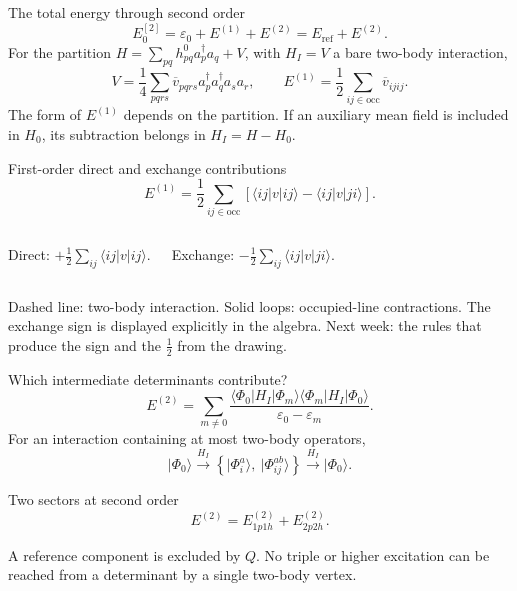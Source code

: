 \documentclass[aspectratio=169,10pt]{beamer}
\newcommand{\ket}[1]{\vert #1\rangle}
\newcommand{\mel}[3]{\langle #1\lvert #2\rvert #3\rangle}
\newcommand{\cre}[1]{a_{#1}^{\dagger}}
\newcommand{\ann}[1]{a_{#1}}
\newcommand{\vbar}[4]{\overline v_{#1#2#3#4}}
\newcommand{\Eref}{E_{\mathrm{ref}}}
\newcommand{\ph}{\Phi_0}
\begin{document}
\begin{frame}{The total energy through second order}
\[
\boxed{E_0^{[2]}=\varepsilon_0+E^{(1)}+E^{(2)}
=\Eref+E^{(2)}.}
\]
For the partition \(H=\sum_{pq}h^0_{pq}\cre{p}\ann{q}+V\), with \(H_I=V\) a bare two-body interaction,
\[
V=\frac14\sum_{pqrs}\vbar{p}{q}{r}{s}\cre{p}\cre{q}\ann{s}\ann{r},
\qquad
\boxed{E^{(1)}=\frac12\sum_{ij\in\mathrm{occ}}\vbar{i}{j}{i}{j}.}
\]
\small The form of \(E^{(1)}\) depends on the partition. If an auxiliary mean field is included in \(H_0\), its subtraction belongs in \(H_I=H-H_0\).
\end{frame}

\begin{frame}{First-order direct and exchange contributions}
\[
E^{(1)}=\frac12\sum_{ij\in\mathrm{occ}}
\left[\langle ij\lvert v\rvert ij\rangle
-\langle ij\lvert v\rvert ji\rangle\right].
\]
\begin{columns}[c,onlytextwidth]
\centering
{}
\par\small Direct: \(+\tfrac12\sum_{ij}\langle ij|v|ij\rangle\).
\centering
{}
\par\small Exchange: \(-\tfrac12\sum_{ij}\langle ij|v|ji\rangle\).
\end{columns}
\medskip
\small Dashed line: two-body interaction. Solid loops: occupied-line contractions. The exchange sign is displayed explicitly in the algebra. Next week: the rules that produce the sign and the \(\tfrac12\) from the drawing.
\end{frame}

\begin{frame}{Which intermediate determinants contribute?}
\[
E^{(2)}=\sum_{m\ne0}
\frac{\mel{\ph}{H_I}{\Phi_m}\mel{\Phi_m}{H_I}{\ph}}
 {\varepsilon_0-\varepsilon_m}.
\]
For an interaction containing at most two-body operators,
\[
\ket{\ph}\xrightarrow{H_I}
\left\{\ket{\Phi_i^a},\ \ket{\Phi_{ij}^{ab}}\right\}
\xrightarrow{H_I}\ket{\ph}.
\]
\begin{block}{Two sectors at second order}
\[E^{(2)}=E^{(2)}_{1p1h}+E^{(2)}_{2p2h}.\]
\end{block}
\small A reference component is excluded by \(Q\). No triple or higher excitation can be reached from a determinant by a single two-body vertex.
\end{frame}
\end{document}
